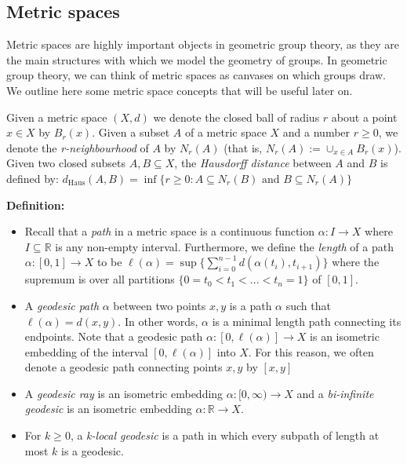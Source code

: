\documentclass[12pt]{article}
\newcommand{\vs}{\vskip10pt}
\begin{document}
	
	\subsection{Metric spaces}
	
	Metric spaces are highly important objects in geometric group theory, as they are the main structures with which we model the geometry of groups. In geometric group theory, we can think of metric spaces as canvases on which groups draw. We outline here some metric space concepts that will be useful later on.
	
	\vs 
	
	Given a metric space $(X,d)$ we denote the closed ball of radius $r$ about a point $x \in X$ by $B_r(x)$. Given a subset $A$ of a metric space $X$ and a number $r \geq 0$, we denote the \textit{r-neighbourhood} of $A$ by $N_r(A)$ (that is, $N_r(A) := \cup_{x \in A} B_r(x)$). Given two closed subsets $A,B \subseteq X$, the \textit{Hausdorff distance} between $A$ and $B$ is defined by: $d_{\text{Haus}}(A,B) = \inf\{r \geq 0: A \subseteq N_r(B) \text{ and } B \subseteq N_r(A)\}$ 
	
	\vs 
	
	\textbf{Definition: } 
	
	\begin{itemize}
		\item Recall that a \textit{path} in a metric space is a continuous function $\alpha: I \rightarrow X$ where $I \subseteq \mathbb{R}$ is any non-empty interval. Furthermore, we define the \textit{length} of a path $\alpha: [0,1] \rightarrow X$ to be $\ell(\alpha) = \sup \{\sum_{i=0}^{n-1} d(\alpha(t_i), t_{i+1})\}$ where the supremum is over all partitions $\{0 = t_0 < t_1 < ... < t_n = 1\}$ of $[0,1]$. 
		\item A \textit{geodesic path} $\alpha$ between two points $x,y$ is a path $\alpha$ such that $\ell(\alpha) = d(x,y)$. In other words, $\alpha$ is a minimal length path connecting its endpoints. Note that a geodesic path $\alpha: [0, \ell(\alpha)] \rightarrow X$ is an isometric embedding of the interval $[0, \ell(\alpha)]$ into $X$. For this reason, we often denote a geodesic path connecting points $x,y$ by $[x,y]$
		\item A \textit{geodesic ray} is an isometric embedding $\alpha: [0, \infty) \rightarrow X$ and a \textit{bi-infinite geodesic} is an isometric embedding $\alpha: \mathbb{R} \rightarrow X$. 
		\item For $k \geq 0$, a \textit{k-local geodesic} is a path in which every subpath of length at most $k$ is a geodesic. 
	\end{itemize}
	
\end{document}
